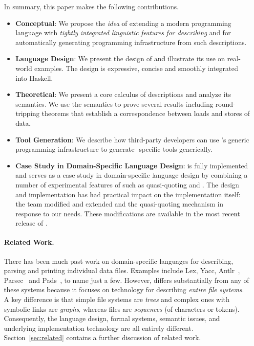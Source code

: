 In summary, this paper makes the following contributions.
\begin{itemize}
\item {\bf Conceptual}:  We propose the {\em idea} 
of extending a modern programming language with
{\em tightly integrated linguistic features for describing \filestores{}}
and for automatically generating programming infrastructure from such 
descriptions.

\item {\bf Language Design}: We present the design of \forest{}
  and illustrate its use on real-world examples.
  The design is expressive, concise and smoothly integrated into
  Haskell.  

\item {\bf Theoretical}: We present a core calculus of \forest{}
descriptions and analyze its semantics.  We use the semantics
to prove several results including round-tripping theorems that
establish a correspondence between loads and stores of \filestore{} data.

\item {\bf Tool Generation}: We describe how third-party developers
  can use \haskell{}'s generic programming infrastructure to generate
  \filestore{}-specific tools generically.

\item {\bf Case Study in Domain-Specific Language Design}: \forest{}
  is fully implemented and serves
  as a case study in domain-specific
  language design by combining a number of
  experimental features of \haskell{} such as quasi-quoting and \template{}.
  The \forest{} design and implementation 
  has had practical impact on the \haskell{} implementation itself:  
  the \haskell{} team modified and extended \template{} and the
  quasi-quoting mechanism in response
  to our needs.  These modifications
  are available in the most recent release of \haskell{}.
\end{itemize}

\paragraph*{Related Work.}
There has been much past work on domain-specific languages for
describing, parsing and printing individual data files. 
Examples include 
Lex, Yacc,
Antlr~\cite{antlr}, Parsec~\cite{LeijenMeijer:parsec} and 
Pads~\cite{fisher+:toplas}, to name just a few.  
However, \forest{} differs
substantially from any of these systems because it focuses on technology
for describing {\em entire file systems}.  
A key difference is that
simple file systems are {\em trees} and complex ones with symbolic links are 
{\em graphs}, whereas files are {\em sequences} (of characters
or tokens). Consequently,
the language design, formal systems,
semantic issues, and underlying implementation 
technology are all entirely different.  Section~\ref{sec:related}
contains a further discussion of related work.

